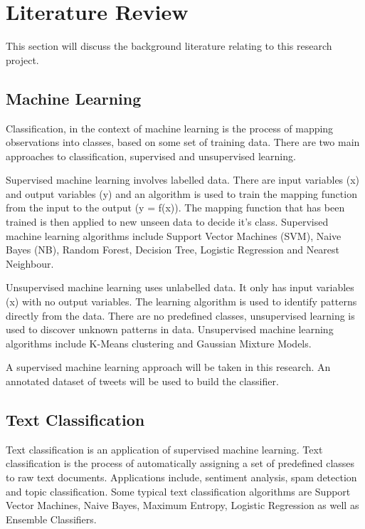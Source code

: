 \chapter{Literature Review}

This section will discuss the background literature relating to this research project.

\section{Machine Learning}

Classification, in the context of machine learning is the process of mapping observations into classes, based on some set of training data. There are two main approaches to classification, supervised and unsupervised learning. 

Supervised machine learning involves labelled data. There are input variables (x) and output variables (y) and an algorithm is used to train the mapping function from the input to the output (y = f(x)). The mapping function that has been trained is then applied to new unseen data to decide it's class. Supervised machine learning algorithms include Support Vector Machines (SVM), Naive Bayes (NB), Random Forest, Decision Tree, Logistic Regression and Nearest Neighbour.

Unsupervised machine learning uses unlabelled data. It only has input variables (x) with no output variables. The learning algorithm is used to identify patterns directly from the data. There are no predefined classes, unsupervised learning is used to discover unknown patterns in data. Unsupervised machine learning algorithms include K-Means clustering and Gaussian Mixture Models. 

A supervised machine learning approach will be taken in this research. An annotated dataset of tweets will be used to build the classifier.

\section{Text Classification}

Text classification is an application of supervised machine learning. Text classification is the process of automatically assigning a set of predefined classes to raw text documents. Applications include, sentiment analysis, spam detection and topic classification. Some typical text classification algorithms are Support Vector Machines, Naive Bayes, Maximum Entropy, Logistic Regression as well as Ensemble Classifiers.

